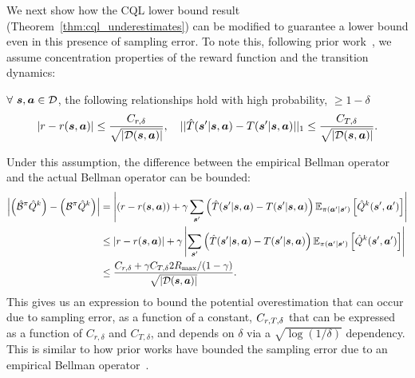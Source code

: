 We next show how the CQL lower bound result (Theorem~\ref{thm:cql_underestimates}) can be modified to guarantee a lower bound even in this presence of sampling error. To note this, following prior work~\citep{jaksch2010near,osband2017posterior}, we assume concentration properties of the reward function and the transition dynamics:
\begin{assumption}
    $\forall~ \boldsymbol{s}, \boldsymbol{a} \in \mathcal{D}$, the following relationships hold with high probability, $\geq 1 - \delta$
    \begin{equation*}
        |r - r(\boldsymbol{s}, \boldsymbol{a})| \leq \frac{C_{r, \delta}}{\sqrt{|\mathcal{D}(\boldsymbol{s}, \boldsymbol{a})|}}, ~~~ ||\hat{T}(\boldsymbol{s}'|\boldsymbol{s}, \boldsymbol{a}) - T(\boldsymbol{s}'|\boldsymbol{s}, \boldsymbol{a})||_{1} \leq \frac{C_{T, \delta}}{\sqrt{|\mathcal{D}(\boldsymbol{s}, \boldsymbol{a})|}}.
    \end{equation*}
\end{assumption}

Under this assumption, the difference between the empirical Bellman operator and the actual Bellman operator can be bounded:
\begin{align*}
    \left\vert\left(\hat{\mathcal{B}}^\pi \hat{Q}^k \right) - \left({\mathcal{B}}^\pi \hat{Q}^k \right)\right\vert &= \left\vert\left(r - r(\boldsymbol{s}, \boldsymbol{a})\right) + \gamma \sum_{\boldsymbol{s}'} \left(\hat{T}(\boldsymbol{s}'|\boldsymbol{s}, \boldsymbol{a}) - T(\boldsymbol{s}'|\boldsymbol{s},\boldsymbol{a})\right) \mathbb{E}_{\pi(\boldsymbol{a}'|\boldsymbol{s}')}\left[\hat{Q}^k(\boldsymbol{s}' , \boldsymbol{a}')\right]\right\vert\\
    &\leq \left\vert r - r(\boldsymbol{s}, \boldsymbol{a})\right\vert + \gamma \left\vert \sum_{\boldsymbol{s}'} \left(\hat{T}(\boldsymbol{s}'|\boldsymbol{s}, \boldsymbol{a}) - T(\boldsymbol{s}'|\boldsymbol{s},\boldsymbol{a})\right) \mathbb{E}_{\pi(\boldsymbol{a}'|\boldsymbol{s}')}\left[\hat{Q}^k(\boldsymbol{s}' , \boldsymbol{a}')\right]\right\vert\\
    &\leq \frac{C_{r, \delta} + \gamma C_{T, \delta} 2R_{\max} / (1 - \gamma)}{\sqrt{|\mathcal{D}(\boldsymbol{s}, \boldsymbol{a})|}}. 
\end{align*}
This gives us an expression to bound the potential overestimation that can occur due to sampling error, as a function of a constant, $C_{r, T, \delta}$ that can be expressed as a function of $C_{r, \delta}$ and $C_{T, \delta}$, and depends on $\delta$ via a $\sqrt{\log (1/\delta)}$ dependency. This is similar to how prior works have bounded the sampling error due to an empirical Bellman operator~\citep{osband2017posterior,jaksch2010near}.

